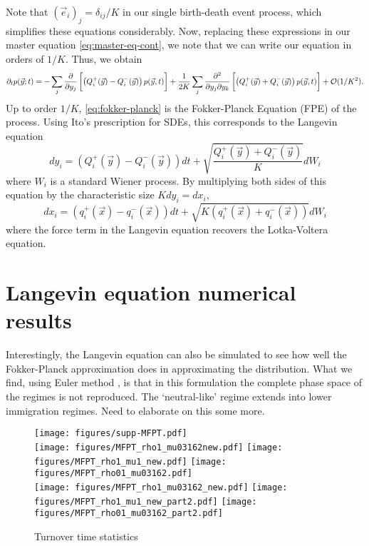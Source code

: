 \documentclass[9pt,twoside,lineno]{pnas-new}
\begin{document}
Note that $(\vec{e}_i)_j=\delta_{ij}/K$ in our single birth-death event process, which simplifies these equations considerably. 
Now, replacing these expressions in our master equation \ref{eq:master-eq-cont}, we note that we can write our equation in orders of $1/K$.
Thus, we obtain
\begin{multline}
\label{eq:fokker-planck}
    \partial_t  p(\vec{y};t) =
    -\sum_j  \frac{\partial}{\partial y_j}\left[\left( Q^+_i(\vec{y})-Q^-_i(\vec{y})\right)p(\vec{y},t)\vphantom{\frac{1}{1}}\right]
    + \frac{1}{2 K}\sum_j  \frac{\partial^2}{\partial y_j \partial y_k}\left[\left( Q^+_i(\vec{y})+Q^-_i(\vec{y})\right)p(\vec{y},t)\vphantom{\frac{1}{1}}\right] + \mathcal{O}(1/K^2).
\end{multline}
Up to order $1/K$, \ref{eq:fokker-planck} is the Fokker-Planck Equation (FPE) of the process.
Using Ito's prescription for SDEs, this corresponds to the Langevin equation
\begin{equation}
    \label{eq:langevin}
    d y_i = \left( Q^+_i(\vec{y})-Q^-_i(\vec{y}) \right)dt + \sqrt{ \frac{Q^+_i(\vec{y})+Q^-_i(\vec{y})}{K} } dW_i
\end{equation}
where $W_i$ is a standard Wiener process. By multiplying both sides of this equation by the characteristic size $K dy_i = dx_i$,
\begin{equation}
    \label{eq:langevin-LV}
    d x_i = \left( q^+_i(\vec{x})-q^-_i(\vec{x}) \right)dt + \sqrt{ K \left( q^+_i(\vec{x})+q^-_i(\vec{x})\right) } dW_i
\end{equation}
where the force term in the Langevin equation recovers the Lotka-Voltera equation.

\section*{Langevin equation numerical results}
Interestingly, the Langevin equation can also be simulated to see how well the Fokker-Planck approximation does in approximating the distribution. What we find, using Euler method ,  is that in this formulation the complete phase space of the regimes is not reproduced. The `neutral-like' regime extends into lower immigration regimes. Need to elaborate on this some more.

\begin{figure}
    \texttt{[image: figures/supp-MFPT.pdf]}
    \\
\texttt{[image: figures/MFPT\_rho1\_mu03162new.pdf]} 
\texttt{[image: figures/MFPT\_rho1\_mu1\_new.pdf]} 
\texttt{[image: figures/MFPT\_rho01\_mu03162.pdf]} 
\\
\texttt{[image: figures/MFPT\_rho1\_mu03162\_new.pdf]}  
\texttt{[image: figures/MFPT\_rho1\_mu1\_new\_part2.pdf]}
\texttt{[image: figures/MFPT\_rho01\_mu03162\_part2.pdf]}
\caption{Turnover time statistics}
\end{figure}
\end{document}
